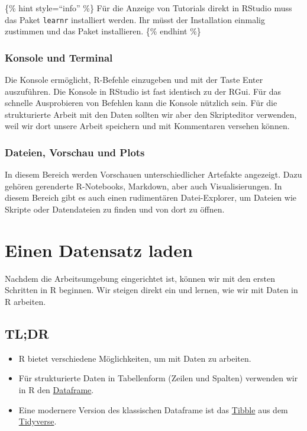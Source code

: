 \documentclass[
]{book}
\providecommand{\tightlist}{%
  \setlength{\itemsep}{0pt}\setlength{\parskip}{0pt}}
\begin{document}
\{\% hint style=``info'' \%\}
Für die Anzeige von Tutorials direkt in RStudio muss das Paket \texttt{learnr} installiert werden. Ihr müsst der Installation einmalig zustimmen und das Paket installieren.
\{\% endhint \%\}

\hypertarget{konsole-und-terminal}{%
\subsection{Konsole und Terminal}\label{konsole-und-terminal}}

Die Konsole ermöglicht, R-Befehle einzugeben und mit der Taste Enter auszuführen. Die Konsole in RStudio ist fast identisch zu der RGui. Für das schnelle Ausprobieren von Befehlen kann die Konsole nützlich sein. Für die strukturierte Arbeit mit den Daten sollten wir aber den Skripteditor verwenden, weil wir dort unsere Arbeit speichern und mit Kommentaren versehen können.

\hypertarget{dateien-vorschau-und-plots}{%
\subsection{Dateien, Vorschau und Plots}\label{dateien-vorschau-und-plots}}

In diesem Bereich werden Vorschauen unterschiedlicher Artefakte angezeigt. Dazu gehören gerenderte R-Notebooks, Markdown, aber auch Visualisierungen. In diesem Bereich gibt es auch einen rudimentären Datei-Explorer, um Dateien wie Skripte oder Datendateien zu finden und von dort zu öffnen.

\hypertarget{einen-datensatz-laden}{%
\chapter{Einen Datensatz laden}\label{einen-datensatz-laden}}

Nachdem die Arbeitsumgebung eingerichtet ist, können wir mit den ersten Schritten in R beginnen. Wir steigen direkt ein und lernen, wie wir mit Daten in R arbeiten.

\hypertarget{tldr-1}{%
\section*{TL;DR}\label{tldr-1}}

\begin{itemize}
\tightlist
\item
  R bietet verschiedene Möglichkeiten, um mit Daten zu arbeiten.
\item
  Für strukturierte Daten in Tabellenform (Zeilen und Spalten) verwenden wir in R den \protect\hyperlink{der-dataframe}{Dataframe}.
\item
  Eine modernere Version des klassischen Dataframe ist das \protect\hyperlink{tibbles}{Tibble} aus dem \protect\hyperlink{das-tidyverse}{Tidyverse}.
\end{itemize}
\end{document}
